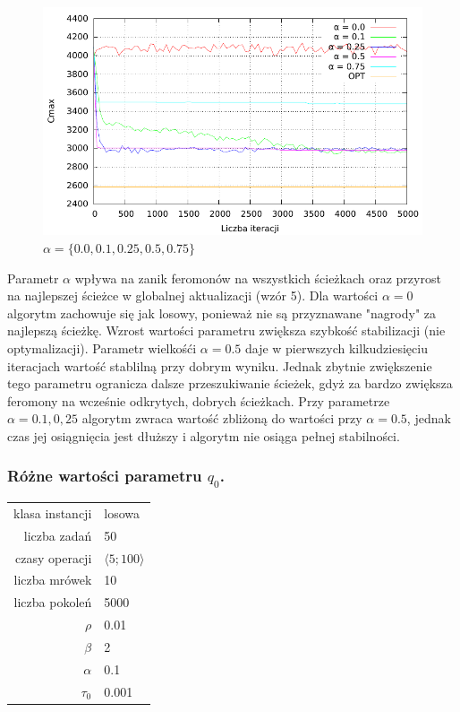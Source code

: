 \documentclass[10pt,a4paper]{article}
\begin{document}
\begin{figure}[h]
    \centering
    \includegraphics{./figures/inst01_rnd_alpha_smooth.pdf}
    \caption{$ \alpha = \{ 0.0, 0.1, 0.25, 0.5, 0.75 \} $}
\end{figure}
\vspace{15mm}
Parametr $\alpha$ wpływa na zanik feromonów na wszystkich ścieżkach oraz przyrost na najlepszej ścieżce w globalnej aktualizacji (wzór 5). Dla wartości $\alpha = 0$ algorytm zachowuje się jak losowy, ponieważ nie są przyznawane "nagrody" za najlepszą ścieżkę.
Wzrost wartości parametru zwiększa szybkość stabilizacji (nie optymalizacji).
Parametr wielkośći $\alpha = 0.5$ daje w pierwszych kilkudziesięciu iteracjach wartość stablilną przy dobrym wyniku.
Jednak zbytnie zwiększenie tego parametru ogranicza dalsze przeszukiwanie ścieżek, gdyż za bardzo zwiększa feromony na wcześnie odkrytych, dobrych ścieżkach.
Przy parametrze $\alpha = {0.1, 0,25}$ algorytm zwraca wartość zbliżoną do wartości przy $\alpha = 0.5$, jednak czas jej osiągnięcia jest dłuższy i algorytm nie osiąga pełnej stabilności.


\newpage
\subsubsection{Różne wartości parametru $q_0$.}
\vspace{6 mm}
\begin{center}
\begin{tabular}{|r|l|}
  \hline
  klasa instancji & losowa \\
  liczba zadań & 50 \\
  czasy operacji & $ \langle 5;100 \rangle $  \\
  liczba mrówek & 10 \\
  liczba pokoleń & 5000 \\
  $ \rho $ & 0.01 \\
  $ \beta $ & 2 \\
  $ \alpha $ & 0.1 \\
  $ \tau_0 $ & 0.001 \\
  \hline
\end{tabular}
\end{center}
\end{document}
